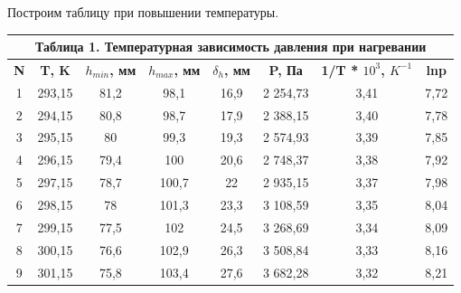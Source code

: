 \documentclass[a4paper,12pt]{article} %
\theoremstyle{plain} %
\theoremstyle{definition} %
\theoremstyle{remark} %
\begin{document}
Построим таблицу при повышении температуры.
\begin{table}[H]
\begin{center}
\begin{tabular}{|c|c|c|c|c|c|c|c|}
\hline
\multicolumn{8}{|c|}{\textbf{Таблица 1. Температурная зависимость давления при нагревании}}                                                                                   \\ \hline
\textbf{N} & \textbf{T, K} & \textbf{$h_{min}$, мм} & \textbf{$h_{max}$, мм} & \textbf{$\delta_{h}$, мм} & \textbf{P, Па} & \textbf{1/T * $10^{3}$, $K ^ {-1}$} & \textbf{lnp} \\ \hline
1          & 293,15        & 81,2                   & 98,1                   & 16,9                      & 2 254,73       & 3,41                                & 7,72         \\ \hline
2          & 294,15        & 80,8                   & 98,7                   & 17,9                      & 2 388,15       & 3,40                                & 7,78         \\ \hline
3          & 295,15        & 80                     & 99,3                   & 19,3                      & 2 574,93       & 3,39                                & 7,85         \\ \hline
4          & 296,15        & 79,4                   & 100                    & 20,6                      & 2 748,37       & 3,38                                & 7,92         \\ \hline
5          & 297,15        & 78,7                   & 100,7                  & 22                        & 2 935,15       & 3,37                                & 7,98         \\ \hline
6          & 298,15        & 78                     & 101,3                  & 23,3                      & 3 108,59       & 3,35                                & 8,04         \\ \hline
7          & 299,15        & 77,5                   & 102                    & 24,5                      & 3 268,69       & 3,34                                & 8,09         \\ \hline
8          & 300,15        & 76,6                   & 102,9                  & 26,3                      & 3 508,84       & 3,33                                & 8,16         \\ \hline
9          & 301,15        & 75,8                   & 103,4                  & 27,6                      & 3 682,28       & 3,32                                & 8,21         \\ \hline

\end{tabular}
\end{center}
\end{table}
\end{document}
